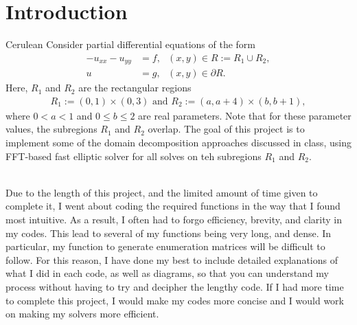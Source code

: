 \documentclass[12pt]{article}
\begin{document}
\part*{Introduction} 
\begin{mybox}{Cerulean}{}
Consider partial differential equations of the form
\begin{align*}
-u_{xx} - u_{yy} &= f, \text{ } (x,y)\in R:= R_1 \cup R_2, \tag{1}\\
u &= g, \text{ } (x,y) \in \partial R.
\end{align*}
Here, $R_1$ and $R_2$ are the rectangular regions
\begin{align*}
R_1:=(0,1)\times (0,3) \text{ and } R_2:=(a,a+4)\times(b,b+1),\tag{2}
\end{align*}
where $0<a<1$ and $0\leq b \leq 2$ are real parameters.  Note that for these parameter values, the subregions $R_1$ and $R_2$ overlap.  The goal of this project is to implement some of the domain decomposition approaches discussed in class, using FFT-based fast elliptic solver for all solves on teh subregions $R_1$ and $R_2$.
\end{mybox} \text{ }\\

Due to the length of this project, and the limited amount of time given to complete it, I went about coding the required functions in the way that I found most intuitive.  As a result, I often had to forgo efficiency, brevity, and clarity in my codes.  This lead to several of my functions being very long, and dense.  In particular, my function to generate enumeration matrices will be difficult to follow.  For this reason, I have done my best to include detailed explanations of what I did in each code, as well as diagrams, so that you can understand my process without having to try and decipher the lengthy code.  If I had more time to complete this project, I would make my codes more concise and I would work on making my solvers more efficient. 

\newpage
\end{document}

